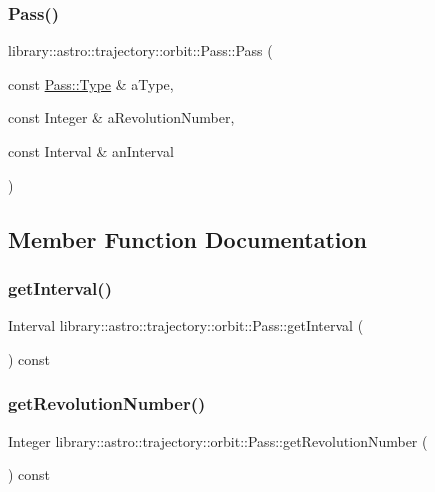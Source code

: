\subsubsection{\texorpdfstring{Pass()}{Pass()}}
{\footnotesize\ttfamily library\+::astro\+::trajectory\+::orbit\+::\+Pass\+::\+Pass (\begin{DoxyParamCaption}\item[{const \hyperlink{classlibrary_1_1astro_1_1trajectory_1_1orbit_1_1_pass_aa2a63a39c759bf96a0cc62a6ed3d2ceb}{Pass\+::\+Type} \&}]{a\+Type,  }\item[{const Integer \&}]{a\+Revolution\+Number,  }\item[{const Interval \&}]{an\+Interval }\end{DoxyParamCaption})}



\subsection{Member Function Documentation}
\mbox{\label{classlibrary_1_1astro_1_1trajectory_1_1orbit_1_1_pass_ab50b2d21353e444003eae95636c47994}} 
\subsubsection{\texorpdfstring{get\+Interval()}{getInterval()}}
{\footnotesize\ttfamily Interval library\+::astro\+::trajectory\+::orbit\+::\+Pass\+::get\+Interval (\begin{DoxyParamCaption}{ }\end{DoxyParamCaption}) const}

\mbox{\label{classlibrary_1_1astro_1_1trajectory_1_1orbit_1_1_pass_a728be6c0754374ecd51fc6b6e48e0696}} 
\subsubsection{\texorpdfstring{get\+Revolution\+Number()}{getRevolutionNumber()}}
{\footnotesize\ttfamily Integer library\+::astro\+::trajectory\+::orbit\+::\+Pass\+::get\+Revolution\+Number (\begin{DoxyParamCaption}{ }\end{DoxyParamCaption}) const}

